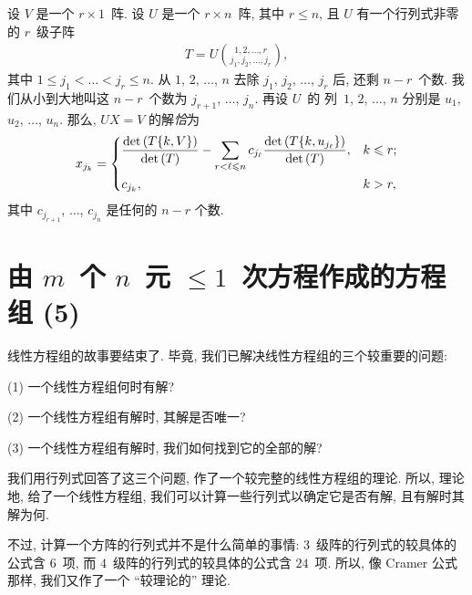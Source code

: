 \begin{theorem}
    设 \(V\) 是一个 \(r \times 1\)~阵.
    设 \(U\) 是一个 \(r \times n\)~阵,
    其中 \(r \leq n\),
    且 \(U\) 有一个行列式非零的 \(r\)~级子阵
    \begin{align*}
        T = U\binom{1,2,\dots,r}{j_1,j_2,\dots,j_r},
    \end{align*}
    其中 \(1 \leq j_1 < \dots < j_r \leq n\).
    从 \(1\), \(2\), \(\dots\), \(n\)
    去除 \(j_1\), \(j_2\), \(\dots\), \(j_r\)
    后, 还剩 \(n - r\)~个数.
    我们从小到大地叫这 \(n - r\)~个数为
    \(j_{r+1}\), \(\dots\), \(j_n\).
    再设 \(U\)~的%
    列~\(1\), \(2\), \(\dots\), \(n\)
    分别是 \(u_1\), \(u_2\), \(\dots\), \(u_n\).
    那么, \(UX = V\) 的解\emph{恰}为
    \begin{align*}
        x_{j_k}
        = \begin{dcases}
              \frac{\det {(T\{k,V\})}}{\det {(T)}}
              - \sum_{r < \ell \leq n}
              {c_{j_\ell}
              \frac{\det {(T\{k,u_{j_\ell}\})}}{\det {(T)}}},
               & k \leq r; \\
              c_{j_k},
               & k > r,
          \end{dcases}
    \end{align*}
    其中 \(c_{j_{r+1}}\), \(\dots\), \(c_{j_n}\)
    是任何的 \(n-r\) 个数.
\end{theorem}

\section{\texorpdfstring{由 \(m\)~个 \(n\)~元
      \({\leq} 1\)~次方程作成的方程组 (5)}%
  {由 m 个 n 元 ≤1 次方程作成的方程组 (5)}}

\maldevigalegajxo

线性方程组的故事要结束了.
毕竟, 我们已解决线性方程组的三个较重要的问题:

(1)
一个线性方程组何时有解?

(2)
一个线性方程组有解时, 其解是否唯一?

(3)
一个线性方程组有解时, 我们如何找到它的全部的解?

我们用行列式回答了这三个问题,
作了一个较完整的线性方程组的理论.
所以, 理论地, 给了一个线性方程组,
我们可以计算一些行列式以确定它是否有解,
且有解时其解为何.

不过,
计算一个方阵的行列式并不是什么简单的事情:
\(3\)~级阵的行列式的较具体的公式含 \(6\)~项,
而 \(4\)~级阵的行列式的较具体的公式含 \(24\)~项.
所以, 像 Cramer 公式那样,
我们又作了一个 ``较理论的'' 理论.

